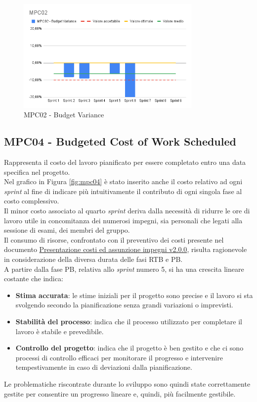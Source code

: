 \begin{figure}[htbp]
    \centering
    \includegraphics[width=0.8\textwidth]{img/MPC02.png}
    \caption{MPC02 - Budget Variance}
    \label{fig:mpc02}
\end{figure}


\newpage

\subsection{MPC04 - Budgeted Cost of Work Scheduled}
\label{s:mpc04}
Rappresenta il costo del lavoro pianificato per essere completato entro una data specifica nel progetto.\\
Nel grafico in Figura \ref{fig:mpc04} è stato inserito anche il costo relativo ad ogni \textit{sprint} al fine di indicare più intuitivamente il contributo di ogni singola fase al costo complessivo.\\
Il minor costo associato al quarto \textit{sprint} deriva dalla necessità di ridurre le ore di lavoro utile in concomitanza dei numerosi impegni, sia personali che legati alla sessione di esami, dei membri del gruppo.\\
Il consumo di risorse, confrontato con il preventivo dei costi presente nel documento \href{https://project-swenergy.github.io/Candidatura/Presentazione%20costi%20e%20assunzione%20impegni.pdf}{Presentazione costi ed assunzione impegni v2.0.0}, risulta ragionevole in considerazione della diversa durata delle fasi RTB e PB.\\
A partire dalla fase PB, relativa allo \textit{sprint} numero 5, si ha una crescita lineare costante che indica:
\begin{itemize}
    \item \textbf{Stima accurata}: le stime iniziali per il progetto sono precise e il lavoro si sta svolgendo secondo la pianificazione senza grandi variazioni o imprevisti.
    \item \textbf{Stabilità del processo}: indica che il processo utilizzato per completare il lavoro è stabile e prevedibile.
    \item \textbf{Controllo del progetto}: indica che il progetto è ben gestito e che ci sono processi di controllo efficaci per monitorare il progresso e intervenire tempestivamente in caso di deviazioni dalla pianificazione.
\end{itemize} 
Le problematiche riscontrate durante lo sviluppo sono quindi state correttamente gestite per consentire un progresso lineare e, quindi, più facilmente gestibile.

